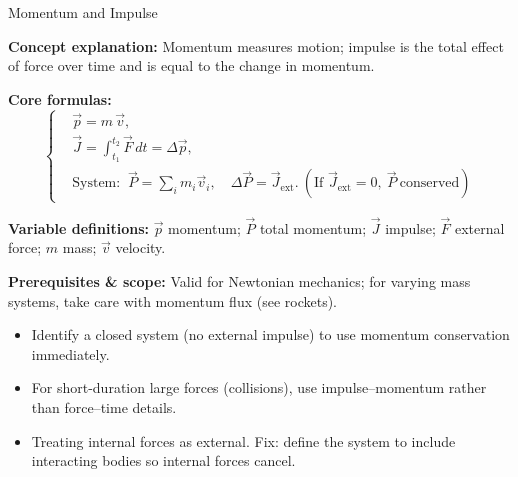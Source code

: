 \label{unit:momentum}

\begin{KnowledgePoint}{Momentum and Impulse \Core}
  \KPFormulas
  \begin{formulabox}
  \textbf{Concept explanation:} Momentum measures motion; impulse is the total effect of force over time and is equal to the change in momentum.

  \textbf{Core formulas:}
  \[
  \left\{\begin{aligned}
    &\vec p=m\,\vec v,\\
    &\vec J=\int_{t_1}^{t_2} \vec F\,dt=\Delta\vec p,\\
    &\text{System: }\ \vec P=\sum_i m_i\vec v_i,\quad \Delta\vec P=\vec J_{\text{ext}}.\ (\text{If }\vec J_{\text{ext}}=0,\ \vec P\ \text{conserved})
  \end{aligned}\right.
  \]

  \textbf{Variable definitions:} $\vec p$ momentum; $\vec P$ total momentum; $\vec J$ impulse; $\vec F$ external force; $m$ mass; $\vec v$ velocity.

  

  \textbf{Prerequisites \& scope:} Valid for Newtonian mechanics; for varying mass systems, take care with momentum flux (see rockets).
  \end{formulabox}

  \KPHeuristics
  \begin{heuristicsbox}
  \begin{itemize}[leftmargin=*]
    \item Identify a closed system (no external impulse) to use momentum conservation immediately.
    \item For short-duration large forces (collisions), use impulse–momentum rather than force–time details.
  \end{itemize}
  \vspace{0.4em}
  \begin{itemize}[leftmargin=*]
    \item Treating internal forces as external. Fix: define the system to include interacting bodies so internal forces cancel.
  \end{itemize}
  \end{heuristicsbox}


\end{KnowledgePoint}
